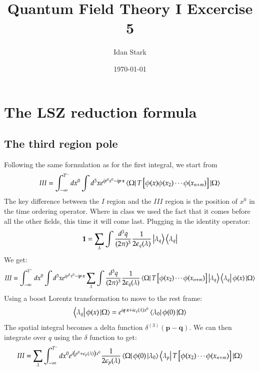 \documentclass{article}
\title{Quantum Field Theory I Excercise 5}
\author{Idan Stark}
\date{\today}
\begin{document}
\maketitle

\section{The LSZ reduction formula}
\subsection{The third region pole}
Following the same formulation as for the first integral, we start from
\begin{equation}
    III = \int_{-\infty}^{T^{-}}dx^0 \int d^3 xe^{ip^0x^0 - i\boldsymbol{p}\cdot{\boldsymbol{x}}}
    \bra{\Omega}T\left[\phi(x)\phi(x_2)\cdots\phi(x_{n+m})\right]\ket{\Omega}
\end{equation}
The key difference between the $I$ region and the $III$ region is the position of $x^0$ in the time ordering operator. Where in class we used the fact that it comes before all the other fields, this time it will come last.
Plugging in the identity operator:
\begin{equation}
    \boldsymbol{1} = \sum_{\lambda}\int\frac{d^3q}{(2\pi)^3}\frac{1}{2\epsilon_q(\lambda)}\ket{\lambda_q}\bra{\lambda_q}
\end{equation}
We get:
\begin{equation}
    III = \int_{-\infty}^{T^{-}}dx^0 \int d^3 xe^{ip^0x^0 - i\boldsymbol{p}\cdot\boldsymbol{x}}
    \sum_{\lambda}\int\frac{d^3q}{(2\pi)^3}\frac{1}{2\epsilon_q(\lambda)}
    \bra{\Omega}T\left[\phi(x_2)\cdots\phi(x_{n+m})\right]\ket{\lambda_q}\bra{\lambda_q}\phi(x)\ket{\Omega}
\end{equation}
Using a boost Lorentz transformation to move to the rest frame:
\begin{equation}
\begin{gathered}
    \bra{\lambda_q}\phi(x)\ket{\Omega} = e^{i\boldsymbol{q}\cdot\boldsymbol{x} + i\epsilon_q(\lambda)x^0}\bra{\lambda_0}\phi(0)\ket{\Omega}
\end{gathered}
\end{equation}
The spatial integral becomes a delta function $\delta^{(3)}(\boldsymbol{p} - \boldsymbol{q})$. We can then integrate over $q$ using the $\delta$ function to get:
\begin{equation}
\begin{gathered}
    III =  \sum_{\lambda}\int_{-\infty}^{T^{-}}dx^0 e^{i\left(p^0 + \epsilon_p(\lambda)\right)x^0}
    \frac{1}{2\epsilon_p(\lambda)}
    \bra{\Omega}\phi(0)\ket{\lambda_0}\bra{\lambda_p}T\left[\phi(x_2)\cdots\phi(x_{n+m})\right]\ket{\Omega}
\end{gathered}
\end{equation}
\end{document}
